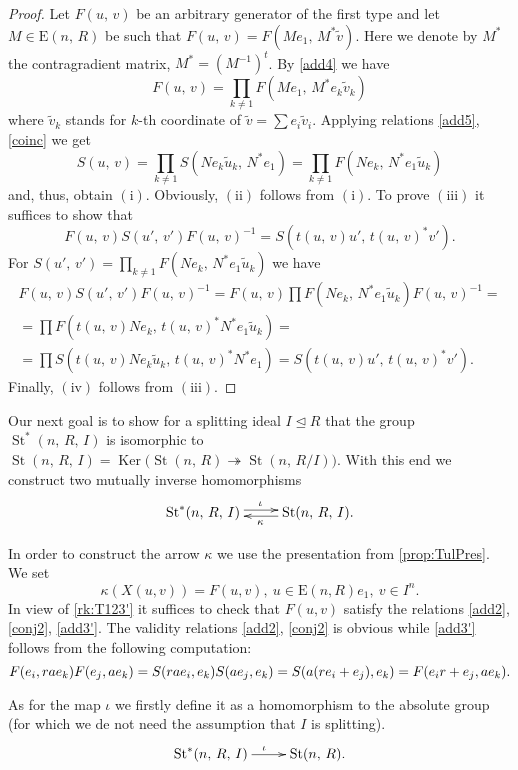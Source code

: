 \documentclass[11pt]{amsart}
\theoremstyle{plain} \declaretheorem[name=Theorem, Refname={Theorem,Theorems}]{tm} \Crefname{tm}{Theorem}{Theorems}
\numberwithin{equation}{section}
\theoremstyle{definition} \newtheorem{df}[lm]{Definition} \Crefname{df}{Definition}{Definitions}
\theoremstyle{remark} \newtheorem{rk}[lm]{Remark} \Crefname{rk}{Remark}{Remarks}
\newcommand{\Ker}{\mathop{\mathrm{Ker}}\nolimits}
\newcommand{\E}{{\mathrm{E}}}
\newcommand{\St}{\mathop{\mathrm{St}}\nolimits}
\newcommand{\epi}{\twoheadrightarrow}
\newcommand{\inv}{^{-1}}
\begin{document}
\begin{proof}
Let $F(u,\,v)$ be an arbitrary generator of the first type and let $M\in\E(n,\,R)$ be such that $F(u,\,v)=F(Me_1,\,M^*\tilde v)$. 
Here we denote by $M^*$ the contragradient matrix, $M^*=(M\inv)^t$. 
By \eqref{add4} we have $$F(u,\,v)=\prod\limits_{k\neq1}F(Me_1,\,M^*e_k\tilde v_k)$$
where $\tilde v_k$ stands for $k$-th coordinate of $\tilde v=\sum e_i\tilde v_i$.
Applying relations \eqref{add5}, \eqref{coinc} we get
$$S(u,\,v)=\prod\limits_{k\neq1}S(Ne_k\tilde u_k,\,N^*e_1)=\prod\limits_{k\neq1}F(Ne_k,\,N^*e_1\tilde u_k)$$
and, thus, obtain $(\mathrm{i})$. Obviously, $(\mathrm{ii})$ follows from $(\mathrm{i})$. 
To prove $(\mathrm{iii})$ it suffices to show that
$$F(u,\,v)S(u',\,v')F(u,\,v)\inv=S(t(u,\,v)u',\,t(u,\,v)^*v').$$
For $S(u',\,v')=\prod_{k\neq 1} F(Ne_k,\,N^*e_1\tilde u_k)$ we have
\begin{multline*}
F(u,\,v)S(u',\,v')F(u,\,v)\inv=F(u,\,v)\prod F(Ne_k,\,N^*e_1\tilde u_k)F(u,\,v)\inv=\\
=\prod F(t(u,\,v)Ne_k,\,t(u,\,v)^*N^*e_1\tilde u_k)=\\
=\prod S(t(u,\,v)Ne_k\tilde u_k,\,t(u,\,v)^*N^*e_1)=S(t(u,\,v)u',\,t(u,\,v)^*v').
\end{multline*}
Finally, $(\mathrm{iv})$ follows from $(\mathrm{iii})$.
\end{proof}

Our next goal is to show for a splitting ideal $I\trianglelefteq R$ that the group $\St^*(n,\,R,\,I)$ is isomorphic to $\St(n,\,R,\,I)=\Ker\big(\St(n,\,R)\epi\St(n,\,R/I)\big)$.
With this end we construct two mutually inverse homomorphisms
$$\xymatrix{\St^*(n,\,R,\,I)\ar@<0.5ex>[r]^{\iota}&\St(n,\,R,\,I)\ar@<0.5ex>[l]^{\kappa}.}$$

In order to construct the arrow $\kappa$ we use the presentation from \cref{prop:TulPres}.
We set $$\kappa(X(u,v)) = F(u,v),\ u\in \E(n, R)e_1,\ v\in I^n.$$ 
In view of \cref{rk:T123'} it suffices to check that $F(u,v)$ satisfy the relations \eqref{add2}, \eqref{conj2}, \eqref{add3'}.
The validity relations \eqref{add2}, \eqref{conj2} is obvious while \eqref{add3'} follows from the following computation:
$$ F(e_i, rae_k) F(e_j, ae_k) = S(rae_i, e_k) S(ae_j, e_k) = S(a(re_i+e_j), e_k) = F(e_ir+e_j, ae_k). \qedhere $$

As for the map $\iota$ we firstly define it as a homomorphism to the absolute group (for which we de not need the assumption that $I$ is splitting).
$$\xymatrix{\St^*(n,\,R,\,I)\ar@<0.0ex>[r]^{\iota}&\St(n,\,R).}$$
\end{document}
